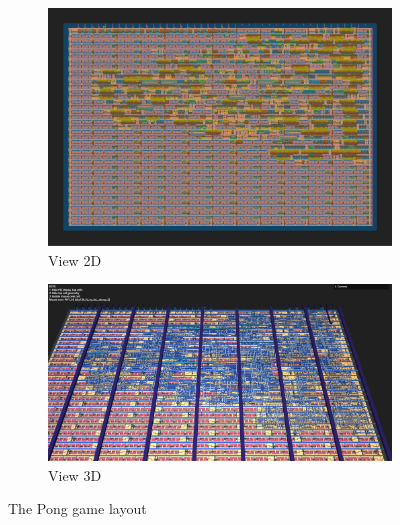 \begin{figure}[H]
    \centering
    \begin{subfigure}[b]{0.45\textwidth}
        \includegraphics[width=\linewidth]{Pictures/Result_Pong_2D_View.png}
        \caption{View 2D}\label{fig:pong_2D}
    \end{subfigure}
    \begin{subfigure}[b]{0.45\textwidth}
        \includegraphics[width=\linewidth]{Pictures/Result_Pong_3D_View.png}
        \caption{View 3D}\label{fig:pong_3D}
    \end{subfigure}
    \caption{The Pong game layout}\label{fig:Pong_Layout}
\end{figure}

